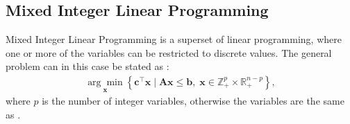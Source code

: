 \subsection{Mixed Integer Linear Programming}

Mixed Integer Linear Programming is a superset of linear programming, where one or more of the variables can be restricted to discrete values. The general problem can in this case be stated as \cite{gasse2019exact}:
\begin{align}\label{eq:milp}
    \underset{\mathbf{x}}{\arg \min }\left\{\mathbf{c}^{\top} \mathbf{x} \mid \mathbf{A} \mathbf{x} \leq \mathbf{b}, \; \mathbf{x} \in \mathbb{Z}_+^{p} \times \mathbb{R}_+^{n-p}\right\},
\end{align}
where $ p $ is the number of integer variables, otherwise the variables are the same as .

